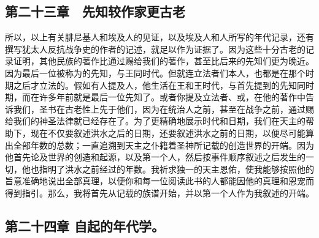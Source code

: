 
\subsection{第二十三章　先知较作家更古老}

所以，以上有关腓尼基人和埃及人的见证，以及埃及人和人所写的年代记录，还有撰写犹太人反抗战争史的作者的记述，就足以作为证据了。因为这些十分古老的记录证明，其他民族的著作比通过赐给我们的著作，甚至比后来的先知们更为晚近。因为最后一位被称为的先知，与王同时代。但就连立法者们本人，也都是在那个时期之后才立法的。假如有人提及人，他生活在王和王时代，与首先提到的先知同时期，而在许多年前就是最后一位先知了。或者你提及立法者、或，在他的著作中告诉我们，圣书在古老性上先于他们，因为在统治人之前，甚至在战争之前，通过赐给我们的神圣法律就已经存在了。为了更精确地展示时代和日期，我们在天主的帮助下，现在不仅要叙述洪水之后的日期，还要叙述洪水之前的日期，以便尽可能算出全部年数的总数；一直追溯到天主之仆籍着圣神所记载的创造世界的开端。因为他首先论及世界的创造和起源，以及第一个人，然后按事件顺序叙述之后发生的一切，他也指明了洪水之前经过的年数。我祈求独一的天主恩佑，使我能够按照他的旨意准确地说出全部真理，以便你和每一位阅读此书的人都能因他的真理和恩宠而得到指引。那么，我将首先从记载的族谱开始，并以第一个人作为我叙述的开端。\par


\subsection{第二十四章 自起的年代学。}

